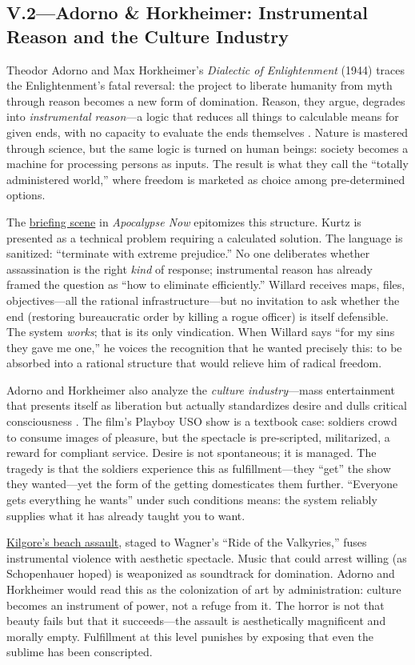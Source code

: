 \subsection*{V.2—Adorno \& Horkheimer: Instrumental Reason and the Culture Industry}
\label{ssec:v-adorno-horkheimer}
Theodor Adorno and Max Horkheimer's \textit{Dialectic of Enlightenment} (1944) traces the
Enlightenment's fatal reversal: the project to liberate humanity from myth through reason
becomes a new form of domination. Reason, they argue, degrades into \emph{instrumental
	reason}---a logic that reduces all things to calculable means for given ends, with no capacity
to evaluate the ends themselves \parencite{AdornoHorkheimer2002}. Nature is mastered through
science, but the same logic is turned on human beings: society becomes a machine for
processing persons as inputs. The result is what they call the ``totally administered world,''
where freedom is marketed as choice among pre-determined options.

The \hyperref[scene:briefing]{briefing scene} in \textit{Apocalypse Now} epitomizes this
structure. Kurtz is presented as a technical problem requiring a calculated solution. The
language is sanitized: ``terminate with extreme prejudice.'' No one deliberates whether
assassination is the right \emph{kind} of
response; instrumental reason has already framed the question as ``how to eliminate
efficiently.'' Willard receives maps, files, objectives---all the rational infrastructure---but
no invitation to ask whether the end (restoring bureaucratic order by killing a rogue officer)
is itself defensible. The system \emph{works}; that is its only vindication. When Willard says
``for my sins they gave me one,'' he voices the recognition that he wanted precisely this: to
be absorbed into a rational structure that would relieve him of radical freedom.

Adorno and Horkheimer also analyze the \emph{culture industry}---mass entertainment that
presents itself as liberation but actually standardizes desire and dulls critical consciousness
\parencite{AdornoHorkheimer2002}. The film's Playboy USO show is a textbook case: soldiers
crowd to consume images of pleasure, but the spectacle is pre-scripted, militarized, a reward
for compliant service. Desire is not spontaneous; it is managed. The tragedy is that the
soldiers experience this as fulfillment---they ``get'' the show they wanted---yet the form of
the getting domesticates them further. ``Everyone gets everything he wants'' under such
conditions means: the system reliably supplies what it has already taught you to want.

\hyperref[scene:kilgore-beach]{Kilgore's beach assault}, staged to Wagner's ``Ride of the
Valkyries,'' fuses instrumental violence with aesthetic spectacle. Music that could arrest
willing (as Schopenhauer hoped) is weaponized as soundtrack for domination. Adorno and
Horkheimer would read this as the colonization of art by administration: culture becomes an
instrument of power, not a refuge
from it. The horror is not that beauty fails but that it succeeds---the assault is
aesthetically magnificent and morally empty. Fulfillment at this level punishes by exposing
that even the sublime has been conscripted.
